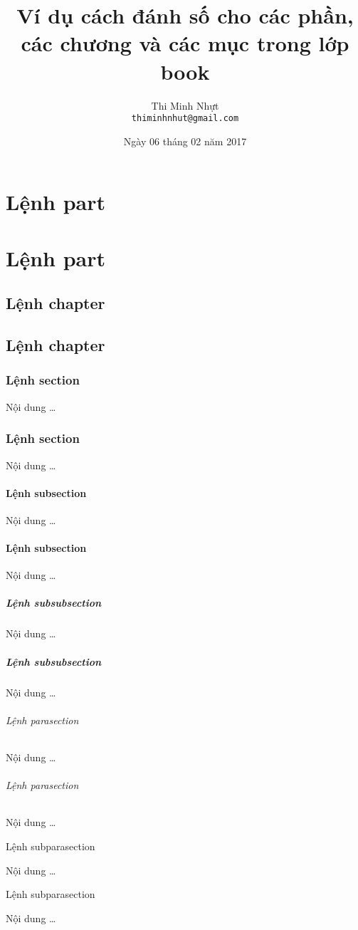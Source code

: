 \documentclass[12pt,a4paper]{report}
\title{\bfseries \huge Ví dụ cách đánh số cho các phần, các chương và các mục trong lớp book}
\author{\Large Thi Minh Nhựt \bigskip \\  \Large \texttt{thiminhnhut@gmail.com}}
\date{\Large Ngày 06 tháng 02 năm 2017}
\newcommand{\parasection}[1]{\paragraph{#1}\mbox{}\medskip\par}
\newcommand{\subparasection}[1]{{\setlength{\parindent}{0pt}\subparagraph{#1}\mbox{}\medskip \par}}
\begin{document}
\maketitle
\tableofcontents
\thispagestyle{empty}
\newpage

\part{Lệnh part}
\part{Lệnh part}

\chapter{Lệnh chapter}
\chapter{Lệnh chapter}

\section{Lệnh section}
Nội dung \ldots
\section{Lệnh section}
Nội dung \ldots

\subsection{Lệnh subsection}
Nội dung \ldots
\subsection{Lệnh subsection}
Nội dung \ldots

\subsubsection{Lệnh subsubsection}
Nội dung \ldots
\subsubsection{Lệnh subsubsection}
Nội dung \ldots

\parasection{Lệnh parasection}
Nội dung \ldots
\parasection{Lệnh parasection}
Nội dung \ldots

\subparasection{Lệnh subparasection}
Nội dung \ldots
\subparasection{Lệnh subparasection}
Nội dung \ldots
\end{document}
